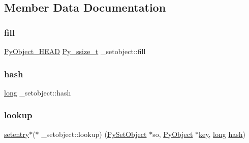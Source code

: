\subsection{Member Data Documentation}
\mbox{\label{struct__setobject_a5986674df7b66022d3849b67ce4748de}} 
\subsubsection{\texorpdfstring{fill}{fill}}
{\footnotesize\ttfamily \mbox{\hyperlink{_python27_2object_8h_a0bf35c1f3ea13f925de94d8593db3b7e}{Py\+Object\+\_\+\+H\+E\+AD}} \mbox{\hyperlink{pyport_8h_ac6411a3dfda9ac6feb9e8d859b1184bc}{Py\+\_\+ssize\+\_\+t}} \+\_\+setobject\+::fill}

\mbox{\label{struct__setobject_a95f66422c1b7168688d136afa2fc7ae5}} 
\subsubsection{\texorpdfstring{hash}{hash}}
{\footnotesize\ttfamily \mbox{\hyperlink{modsupport_8h_a0cb68e00fb9fb1260ee2daadd9fe6611}{long}} \+\_\+setobject\+::hash}

\mbox{\label{struct__setobject_aeef4317350d80202820b281d0527f16c}} 
\subsubsection{\texorpdfstring{lookup}{lookup}}
{\footnotesize\ttfamily \mbox{\hyperlink{structsetentry}{setentry}}$\ast$($\ast$ \+\_\+setobject\+::lookup) (\mbox{\hyperlink{setobject_8h_ab78ba704793f52f076c487b137c4b169}{Py\+Set\+Object}} $\ast$so, \mbox{\hyperlink{_python27_2object_8h_aadc84ac7aed2cfa6f20c25f62bf3dac7}{Py\+Object}} $\ast$\mbox{\hyperlink{setobject_8h_ab06f52e01abcbec81a27c56570d3c10b}{key}}, \mbox{\hyperlink{modsupport_8h_a0cb68e00fb9fb1260ee2daadd9fe6611}{long}} \mbox{\hyperlink{struct__setobject_a95f66422c1b7168688d136afa2fc7ae5}{hash}})}

\mbox{\label{struct__setobject_ab43b8cf4cae699d38fef6811de322175}} 

